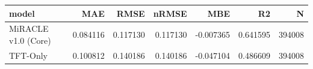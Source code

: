 \begin{tabular}{lrrrrrr}
\toprule
model & MAE & RMSE & nRMSE & MBE & R2 & N \\
\midrule
MiRACLE v1.0 (Core) & 0.084116 & 0.117130 & 0.117130 & -0.007365 & 0.641595 & 394008 \\
TFT-Only & 0.100812 & 0.140186 & 0.140186 & -0.047104 & 0.486609 & 394008 \\
\bottomrule
\end{tabular}
